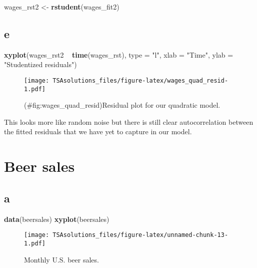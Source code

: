 \documentclass[]{book}
\newenvironment{Shaded}{\begin{snugshade}}{\end{snugshade}}
\newcommand{\KeywordTok}[1]{\textcolor[rgb]{0.13,0.29,0.53}{\textbf{{#1}}}}
\newcommand{\DataTypeTok}[1]{\textcolor[rgb]{0.13,0.29,0.53}{{#1}}}
\newcommand{\StringTok}[1]{\textcolor[rgb]{0.31,0.60,0.02}{{#1}}}
\newcommand{\NormalTok}[1]{{#1}}
\begin{document}
\begin{Shaded}
\begin{Highlighting}[]
\NormalTok{wages_rst2 <-}\StringTok{ }\KeywordTok{rstudent}\NormalTok{(wages_fit2)}
\end{Highlighting}
\end{Shaded}

\subsection*{e}\label{e-1}

\begin{Shaded}
\begin{Highlighting}[]
\KeywordTok{xyplot}\NormalTok{(wages_rst2 ~}\StringTok{ }\KeywordTok{time}\NormalTok{(wages_rst), }\DataTypeTok{type =} \StringTok{"l"}\NormalTok{,}
       \DataTypeTok{xlab =} \StringTok{"Time"}\NormalTok{, }\DataTypeTok{ylab =} \StringTok{"Studentized residuals"}\NormalTok{)}
\end{Highlighting}
\end{Shaded}

\begin{figure}[htbp]
\centering
\texttt{[image: TSAsolutions\_files/figure-latex/wages\_quad\_resid-1.pdf]}
\caption{(\#fig:wages\_quad\_resid)Residual plot for our quadratic
model.}
\end{figure}

This looks more like random noise but there is still clear
autocorrelation between the fitted residuals that we have yet to capture
in our model.

\section{Beer sales}\label{beer-sales}

\subsection*{a}\label{a-23}

\begin{Shaded}
\begin{Highlighting}[]
\KeywordTok{data}\NormalTok{(beersales)}
\KeywordTok{xyplot}\NormalTok{(beersales)}
\end{Highlighting}
\end{Shaded}

\begin{figure}[htbp]
\centering
\texttt{[image: TSAsolutions\_files/figure-latex/unnamed-chunk-13-1.pdf]}
\caption{\label{fig:unnamed-chunk-13}Monthly U.S. beer sales.}
\end{figure}
\end{document}
